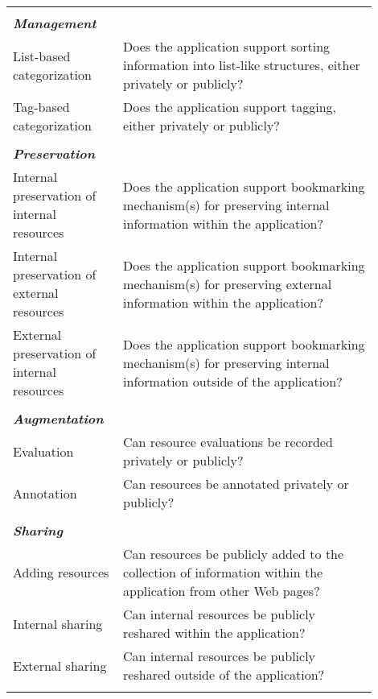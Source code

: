 {\begin{table*}[htbp]
\begin{tabular}{|p{0.25\linewidth}|p{0.65\linewidth}|}
\hline  
&\\        
\emph{\textbf{Management}}                    &                                                                                                           \\
List-based categorization               & Does the application support sorting information into list-like structures, either privately or publicly?                                                  \\
Tag-based categorization               & Does the application support tagging, either privately or publicly?                                                  \\
&\\
\emph{\textbf{Preservation}}                   &                                                                                                           \\
Internal preservation of internal resources       & Does the application support bookmarking mechanism(s) for preserving internal information within the application?        \\
Internal preservation of external resources       & Does the application support bookmarking mechanism(s) for preserving external information within the application?        \\
External preservation of internal resources      & Does the application support bookmarking mechanism(s) for preserving internal information outside of the application? \\ 
&\\
\emph{\textbf{Augmentation}}            &                                                                                                           \\
Evaluation                   & Can resource evaluations be recorded privately or publicly? \\
Annotation                   & Can resources be annotated privately or publicly?                                                                               \\    
 &\\      
\emph{\textbf{Sharing}}            &                                                                                                           \\
Adding resources             & Can resources be publicly added to the collection of information within the application from other Web pages?     \\
Internal sharing         & Can internal resources be publicly reshared within the application?         \\ 
External sharing          & Can internal resources be publicly reshared outside of the application?         \\ 
&\\         
\hline
\end{tabular}
\end{table*}



}
